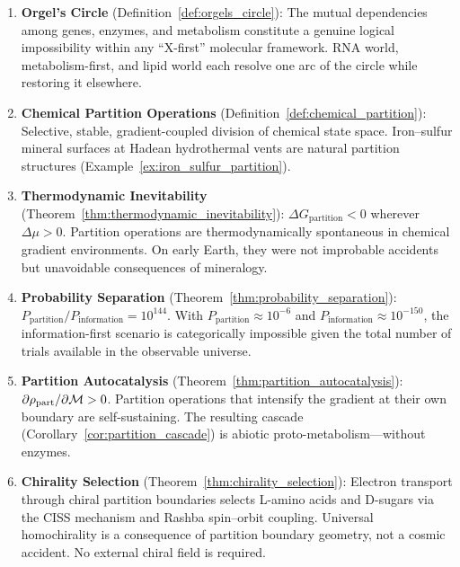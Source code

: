 \begin{chapterbox}[title=Chapter 6 --- Key Results Established]
\begin{enumerate}[label=\textbf{\arabic*.}]
  \item \textbf{Orgel's Circle} (Definition~\ref{def:orgels_circle}): The
        mutual dependencies among genes, enzymes, and metabolism constitute a
        genuine logical impossibility within any ``X-first'' molecular framework.
        RNA world, metabolism-first, and lipid world each resolve one arc of
        the circle while restoring it elsewhere.

  \item \textbf{Chemical Partition Operations} (Definition~\ref{def:chemical_partition}):
        Selective, stable, gradient-coupled division of chemical state space.
        Iron--sulfur mineral surfaces at Hadean hydrothermal vents are natural
        partition structures (Example~\ref{ex:iron_sulfur_partition}).

  \item \textbf{Thermodynamic Inevitability} (Theorem~\ref{thm:thermodynamic_inevitability}):
        $\Delta G_{\mathrm{partition}} < 0$ wherever $\Delta\mu > 0$. Partition
        operations are thermodynamically spontaneous in chemical gradient
        environments. On early Earth, they were not improbable accidents but
        unavoidable consequences of mineralogy.

  \item \textbf{Probability Separation} (Theorem~\ref{thm:probability_separation}):
        $P_{\mathrm{partition}} / P_{\mathrm{information}} = 10^{144}$.
        With $P_{\mathrm{partition}} \approx 10^{-6}$ and
        $P_{\mathrm{information}} \approx 10^{-150}$, the information-first
        scenario is categorically impossible given the total number of trials
        available in the observable universe.

  \item \textbf{Partition Autocatalysis} (Theorem~\ref{thm:partition_autocatalysis}):
        $\partial \rho_{\mathrm{part}} / \partial \mathcal{M} > 0$. Partition
        operations that intensify the gradient at their own boundary are
        self-sustaining. The resulting cascade (Corollary~\ref{cor:partition_cascade})
        is abiotic proto-metabolism---without enzymes.

  \item \textbf{Chirality Selection} (Theorem~\ref{thm:chirality_selection}):
        Electron transport through chiral partition boundaries selects
        L-amino acids and D-sugars via the CISS mechanism and Rashba
        spin--orbit coupling. Universal homochirality is a consequence of
        partition boundary geometry, not a cosmic accident. No external
        chiral field is required.


\end{enumerate}
\end{chapterbox}
